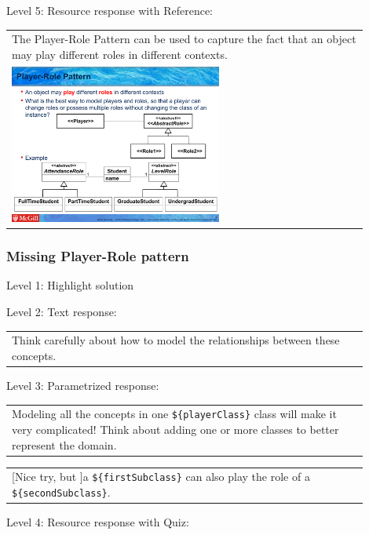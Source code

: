 \noindent Level 5: Resource response with Reference: \medskip

\begin{tabular}{|p{0.9\linewidth}}
The Player-Role Pattern can be used to capture the fact that an object may play different roles
in different contexts.

\\
\includegraphics[width=0.6\textwidth]{images/player_role.png}
\end{tabular} \medskip


\subsubsection{Missing Player-Role pattern}

\noindent Level 1: Highlight solution  \medskip

\noindent Level 2: Text response: \medskip

\begin{tabular}{|p{0.9\linewidth}}
Think carefully about how to model the relationships between these concepts.
\end{tabular} \medskip

\noindent Level 3: Parametrized response: \medskip

\begin{tabular}{|p{0.9\linewidth}}
Modeling all the concepts in one \verb|${playerClass}| class will make it very complicated! Think about adding one or more classes to better represent the domain.
\end{tabular} \medskip

\begin{tabular}{|p{0.9\linewidth}}
[Nice try, but ]a \verb|${firstSubclass}| can also play the role of a \verb|${secondSubclass}|.
\end{tabular} \medskip

\noindent Level 4: Resource response with Quiz: \medskip


